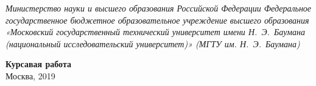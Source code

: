 \begin{titlepage}
	\centering

	{\footnotesize\itshape Министерство науки и высшего образования
	Российской Федерации Федеральное государственное бюджетное
	образовательное учреждение высшего образования «Московский
	государственный технический университет имени Н.~Э.~Баумана
	(национальный исследовательский университет)» (МГТУ им. Н.~Э.~Баумана)
	\\}

	\vspace{60mm}

	\textbf{Курсавая работа}\\

	\vfill
	Москва, 2019
\end{titlepage}
\setcounter{page}{2}